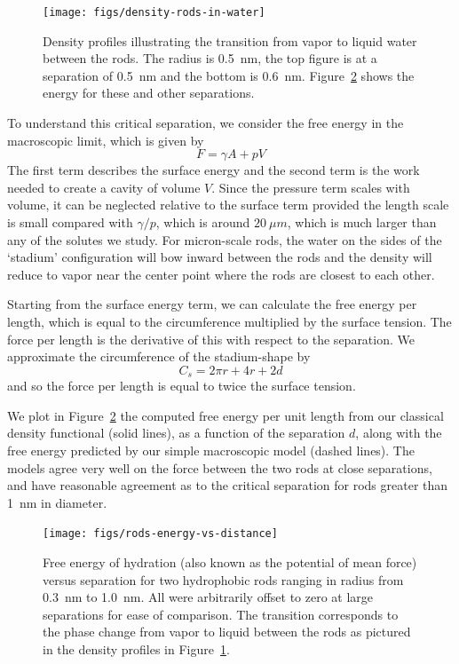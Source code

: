\documentclass[letterpaper,twocolumn,amsmath,amssymb,prb]{revtex4-1}
\begin{document}
\begin{figure}
\begin{center}
\texttt{[image: figs/density-rods-in-water]}
\end{center}
\caption{ Density profiles illustrating the transition from vapor 
to liquid water between the rods. The radius is 0.5~nm, the top figure is 
at a separation of 0.5~nm and the
bottom is 0.6~nm. Figure~\ref{fig:rods-energy-vs-distance} shows
the energy for these and other separations.}
\label{fig:density-rods}
\end{figure}

To understand this critical separation, we consider the free energy in
the macroscopic limit, which is given by
\begin{equation}
F = \gamma A + pV
\end{equation}
The first term describes the surface energy and the second term is the
work needed to create a cavity of volume $V$. Since the pressure term
scales with volume, it can be neglected relative to the surface term
provided the length scale is small compared with $\gamma / p$, which
is around $20~\mu m$, which is much larger than any of the solutes we
study. For micron-scale rods, the water on the sides of the `stadium'
configuration will bow inward between the rods and the density will
reduce to vapor near the center point where the rods are closest to
each other.

Starting from the surface energy term, we can calculate the 
free energy per length, which is equal to the circumference multiplied 
by the surface tension. The force per length is the derivative of this
with respect to the separation. 
We approximate the circumference of the stadium-shape by
\begin{equation}
C_{s} = 2\pi r +4r+2d
\end{equation}
and so the force per length is equal to twice the surface tension.

We plot in Figure~\ref{fig:rods-energy-vs-distance} the computed free energy
per unit length from our classical density functional (solid lines),
as a function of the separation $d$, along with the free energy
predicted by our simple macroscopic model (dashed lines).  The models
agree very well on the force between the two rods at close
separations, and have reasonable agreement as to the critical
separation for rods greater than 1~nm in diameter.

\begin{figure}
\begin{center}
\texttt{[image: figs/rods-energy-vs-distance]}
\end{center}
\caption{ Free energy of hydration (also known as the potential of mean force) 
versus separation for two hydrophobic rods ranging in radius from
0.3~nm to 1.0~nm.
All were arbitrarily offset to zero at large separations for ease of comparison. The
transition corresponds to the phase change from
vapor to liquid between the rods as pictured in the density profiles in 
Figure~\ref{fig:density-rods}. }
\label{fig:rods-energy-vs-distance}
\end{figure}
\end{document}
